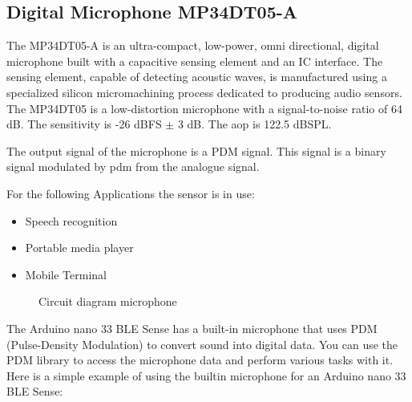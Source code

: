 \subsection{Digital Microphone MP34DT05-A}

The MP34DT05-A is an ultra-compact, low-power, omni directional, digital microphone built with a capacitive sensing element and an IC interface. The sensing element, capable of detecting acoustic waves, is manufactured using a specialized silicon micromachining process dedicated to producing audio sensors.
The MP34DT05 is a low-distortion microphone with a signal-to-noise ratio of 64 dB. The sensitivity is -26 dBFS $\pm$ 3 dB. The \ac{aop} is 122.5 dBSPL.

The output signal of the microphone is a PDM signal. This signal is a binary signal modulated by \ac{pdm}  from the analogue signal. \cite{STMicroelectronics:2021}

For the following Applications the sensor is in use:

\begin{itemize}
    \item Speech recognition 
    \item Portable media player
    \item Mobile Terminal
\end{itemize}

\begin{figure}[h]
  \caption[Circuit diagram microphone]{Circuit diagram microphone \cite{STMicroelectronics:2021}}
\end{figure}

The Arduino nano 33 BLE Sense has a built-in microphone that uses PDM (Pulse-Density Modulation) to convert sound into digital data. You can use the PDM library to access the microphone data and perform various tasks with it. Here is a simple example of using the builtin microphone for an Arduino nano 33 BLE Sense:

